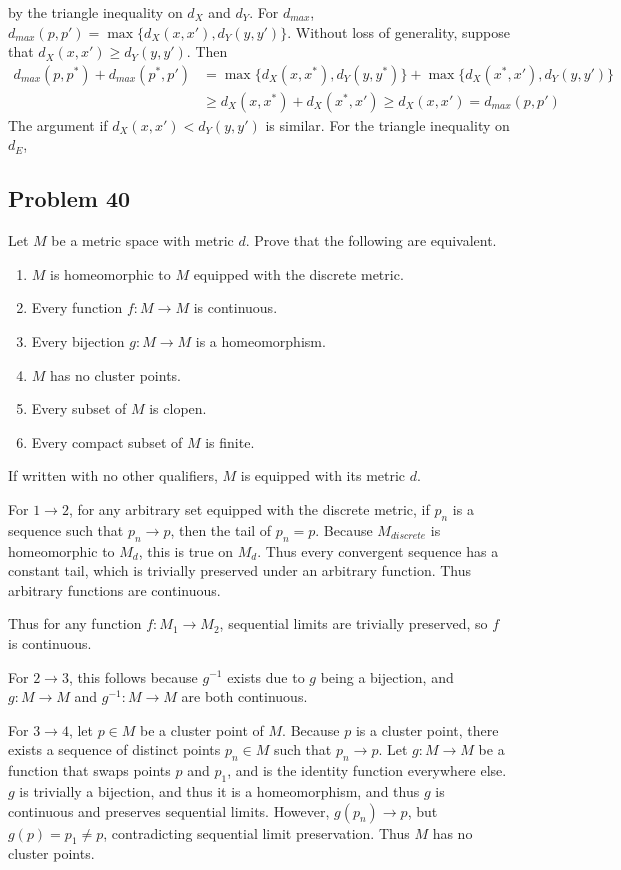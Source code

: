 \documentclass{article}
\begin{document}
by the triangle inequality on $d_X$ and $d_Y$. For $d_{max}$, $d_{max}(p, p') = \max \{d_X(x, x'), d_Y(y, y')\}$. Without loss of generality, suppose that $d_X(x, x') \geq d_Y(y, y')$. Then
\begin{align*}
d_{max}(p, p^*) + d_{max}(p^*, p') &= \max \{d_X(x, x^*), d_Y(y, y^*)\} + \max \{d_X(x^*, x'), d_Y(y, y')\} \\
&\geq d_X(x, x^*) + d_X(x^*, x') \geq d_X(x, x') = d_{max}(p, p')
\end{align*}
The argument if $d_X(x, x') < d_Y(y, y')$ is similar. For the triangle inequality on $d_E$,


\subsection*{Problem 40}

Let $M$ be a metric space with metric $d$. Prove that the following are equivalent.
\begin{enumerate}
\item $M$ is homeomorphic to $M$ equipped with the discrete metric.
\item Every function $f: M \rightarrow M$ is continuous.
\item Every bijection $g: M \rightarrow M$ is a homeomorphism.
\item $M$ has no cluster points.
\item Every subset of $M$ is clopen.
\item Every compact subset of $M$ is finite.
\end{enumerate}

If written with no other qualifiers, $M$ is equipped with its metric $d$.

For $1 \rightarrow 2$, 
for any arbitrary set equipped with the discrete metric, if $p_n$ is a sequence such that $p_n \rightarrow p$, then the tail of $p_n = p$. Because $M_{discrete}$ is homeomorphic to $M_d$, this is true on $M_d$. Thus every convergent sequence has a constant tail, which is trivially preserved under an arbitrary function. Thus arbitrary functions are continuous.

Thus for any function $f: M_1 \rightarrow M_2$, sequential limits are trivially preserved, so $f$ is continuous.

For $2 \rightarrow 3$, this follows because $g^{-1}$ exists due to $g$ being a bijection, and $g: M \rightarrow M$ and $g^{-1}: M \rightarrow M$ are both continuous.

For $3 \rightarrow 4$, let $p \in M$ be a cluster point of $M$. Because $p$ is a cluster point, there exists a sequence of distinct points $p_n \in M$ such that $p_n \rightarrow p$. Let $g: M \rightarrow M$ be a function that swaps points $p$ and $p_1$, and is the identity function everywhere else. $g$ is trivially a bijection, and thus it is a homeomorphism, and thus $g$ is continuous and preserves sequential limits. However, $g(p_n) \rightarrow p$, but $g(p) = p_1 \neq p$, contradicting sequential limit preservation. Thus $M$ has no cluster points.
\end{document}
